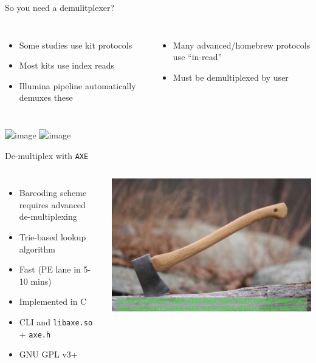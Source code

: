 \documentclass[t]{beamer}
\begin{document}
\begin{frame}{So you need a demulitplexer?}
  \begin{columns}[b]
    \begin{itemize}
      \item Some studies use kit protocols
      \item Most kits use index reads
      \item Illumina pipeline automatically demuxes these
    \end{itemize}
    \begin{itemize}
      \item<2> Many advanced/homebrew protocols use ``in-read''
      \item<2> Must be demultiplexed by user
    \end{itemize}
  \end{columns}
    \begin{center}
      \includegraphics<1|only@1>[width=0.8\textwidth]{img/2ndread_barcodes.png}
      \includegraphics<2>[width=0.8\textwidth]{img/simple_barcodes.png}
    \end{center}
\end{frame}

\begin{frame}{De-multiplex with \texttt{AXE}}
  \begin{columns}[b]
    \begin{itemize}
      \item Barcoding scheme requires advanced de-multiplexing
      \item Trie-based lookup algorithm
      \item Fast (PE lane in 5-10 mins)
      \item Implemented in C
      \item CLI and \texttt{libaxe.so} + \texttt{axe.h}
      \item GNU GPL v3+
    \end{itemize}
    \includegraphics[width=\textwidth]{img/axe.png}
  \end{columns}
\end{frame}
\end{document}
